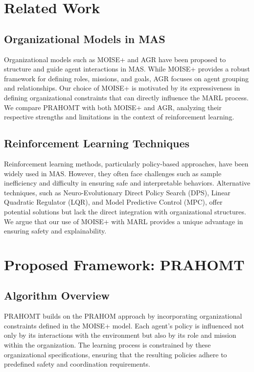 \documentclass{article}
\begin{document}
\section{Related Work}
\subsection{Organizational Models in MAS}
Organizational models such as MOISE+ and AGR have been proposed to structure and guide agent interactions in MAS. While MOISE+ provides a robust framework for defining roles, missions, and goals, AGR focuses on agent grouping and relationships. Our choice of MOISE+ is motivated by its expressiveness in defining organizational constraints that can directly influence the MARL process. We compare PRAHOMT with both MOISE+ and AGR, analyzing their respective strengths and limitations in the context of reinforcement learning.

\subsection{Reinforcement Learning Techniques}
Reinforcement learning methods, particularly policy-based approaches, have been widely used in MAS. However, they often face challenges such as sample inefficiency and difficulty in ensuring safe and interpretable behaviors. Alternative techniques, such as Neuro-Evolutionary Direct Policy Search (DPS), Linear Quadratic Regulator (LQR), and Model Predictive Control (MPC), offer potential solutions but lack the direct integration with organizational structures. We argue that our use of MOISE+ with MARL provides a unique advantage in ensuring safety and explainability.

\section{Proposed Framework: PRAHOMT}
\subsection{Algorithm Overview}
PRAHOMT builds on the PRAHOM approach by incorporating organizational constraints defined in the MOISE+ model. Each agent's policy is influenced not only by its interactions with the environment but also by its role and mission within the organization. The learning process is constrained by these organizational specifications, ensuring that the resulting policies adhere to predefined safety and coordination requirements.
\end{document}
